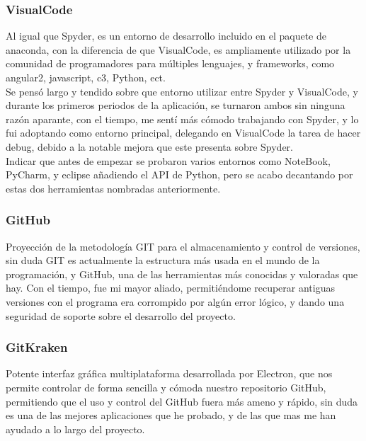 \subsubsection{VisualCode}
Al igual que Spyder, es un entorno de desarrollo incluido en el paquete de anaconda, con la diferencia de que VisualCode, es ampliamente utilizado por la comunidad de programadores para múltiples lenguajes, y frameworks, como angular2, javascript, c3, Python, ect.\\

Se pensó largo y tendido sobre que entorno utilizar entre Spyder y VisualCode, y durante los primeros periodos de la aplicación, se turnaron ambos sin ninguna razón aparante, con el tiempo, me sentí más cómodo trabajando con Spyder, y lo fui adoptando como entorno principal, delegando en VisualCode la tarea de hacer debug, debido a la notable mejora que este presenta sobre Spyder.\\

Indicar que antes de empezar se probaron varios entornos como NoteBook, PyCharm, y eclipse añadiendo el API de Python, pero se acabo decantando por estas dos herramientas nombradas anteriormente.\\

\subsubsection{GitHub}
Proyección de la metodología GIT para el almacenamiento y control de versiones, sin duda GIT es actualmente la estructura más usada en el mundo de la programación, y GitHub, una de las herramientas más conocidas y valoradas que hay.  Con el tiempo, fue mi mayor aliado, permitiéndome recuperar antiguas versiones con el programa era corrompido por algún error lógico, y dando una seguridad de soporte sobre el desarrollo del proyecto.
\subsubsection{GitKraken}
Potente interfaz gráfica multiplataforma desarrollada por Electron, que nos permite controlar de forma sencilla y cómoda nuestro repositorio GitHub, permitiendo que el uso y control del GitHub fuera más ameno y rápido, sin duda es una de las mejores aplicaciones que he probado, y de las que mas me han ayudado a lo largo del proyecto.


